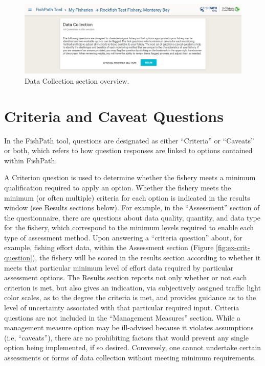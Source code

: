 \documentclass[11pt,]{book}
\begin{document}
\begin{figure}

{\centering \includegraphics[width=0.95\linewidth]{images/dc-overview} 

}

\caption{Data Collection section overview.}\label{fig:dc-overview}
\end{figure}

\hypertarget{criteria-and-caveat-questions}{%
\section{Criteria and Caveat Questions}\label{criteria-and-caveat-questions}}

In the FishPath tool, questions are designated as either ``Criteria'' or ``Caveats'' or both, which refers to how question responses are linked to options contained within FishPath.

A Criterion question is used to determine whether the fishery meets a minimum qualification required to apply an option. Whether the fishery meets the minimum (or often multiple) criteria for each option is indicated in the results window (see Results sections below). For example, in the ``Assessment'' section of the questionnaire, there are questions about data quality, quantity, and data type for the fishery, which correspond to the minimum levels required to enable each type of assessment method. Upon answering a ``criteria question'' about, for example, fishing effort data, within the Assessment section (Figure \ref{fig:ex-crit-question}), the fishery will be scored in the results section according to whether it meets that particular minimum level of effort data required by particular assessment options. The Results section reports not only whether or not each criterion is met, but also gives an indication, via subjectively assigned traffic light color scales, as to the degree the criteria is met, and provides guidance as to the level of uncertainty associated with that particular required input. Criteria questions are not included in the ``Management Measures'' section. While a management measure option may be ill-advised because it violates assumptions (i.e, ``caveats''), there are no prohibiting factors that would prevent any single option being implemented, if so desired. Conversely, one cannot undertake certain assessments or forms of data collection without meeting minimum requirements.
\end{document}
